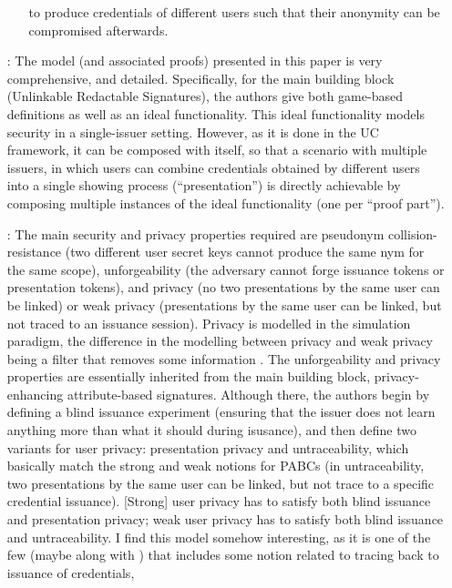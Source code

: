 \begin{enumerate}
\begin{itemize}
    to produce credentials of different users such that their anonymity can
    be compromised afterwards. 
  \end{itemize}
\item[\cite{cdhk15}:] The model (and associated proofs) presented in this paper
  is very comprehensive, and detailed. Specifically, for the main building block
  (Unlinkable Redactable Signatures), the authors give both game-based
  definitions as well as an ideal functionality. This ideal functionality models
  security in a single-issuer setting. However, as it is done in the UC
  framework, it can be composed with itself, so that a scenario with multiple
  issuers, in which users can combine credentials obtained by different users
  into a single showing process (``presentation'') is directly achievable by
  composing multiple instances of the ideal functionality (one per ``proof
  part'').
\item[\cite{ckl+15}:] The main security and privacy properties required are
  pseudonym collision-resistance (two different user secret keys cannot produce
  the same nym for the same scope), unforgeability (the adversary cannot forge
  issuance tokens or presentation tokens), and privacy (no two presentations by
  the same user can be linked) or weak privacy (presentations by the same user
  can be linked, but not traced to an issuance session). Privacy is modelled
  in the simulation paradigm, the difference in the modelling between privacy
  and weak privacy being a filter that removes some information .
  The unforgeability and privacy properties are essentially inherited from the
  main building block, privacy-enhancing attribute-based signatures. Although
  there, the authors begin by defining a blind issuance experiment (ensuring
  that the issuer does not learn anything more than what it should during
  isusance), and then define two variants for user privacy: presentation privacy
  and untraceability, which basically match the strong and weak notions for
  PABCs (in untraceability, two presentations by the same user can be linked,
  but not trace to a specific credential issuance). [Strong] user privacy has
  to satisfy both blind issuance and presentation privacy; weak user privacy
  has to satisfy both blind issuance and untraceability. I find this model
  somehow interesting, as it is one of the few (maybe along with \cite{cmz14})
  that includes some notion related to tracing back to issuance of credentials,

\end{enumerate}
